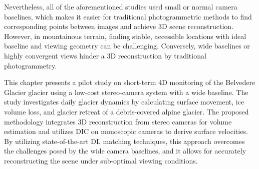 Nevertheless, all of the aforementioned studies used small or normal camera baselines, which makes it easier for traditional photogrammetric methods to find corresponding
points between images and achieve 3D scene reconstruction.
However, in mountainous terrain, finding stable, accessible locations with ideal baseline and viewing geometry can be challenging.
Conversely, wide baselines or highly convergent views hinder a 3D reconstruction by traditional photogrammetry.



This chapter presents a pilot study on short-term 4D monitoring of the Belvedere Glacier glacier using a low-cost stereo-camera system with a wide baseline. 
The study investigates daily glacier dynamics by calculating surface movement, ice volume loss, and glacier retreat of a debris-covered alpine glacier.
The proposed methodology integrates 3D reconstruction from stereo cameras for volume estimation and utilizes DIC on monoscopic cameras to derive surface velocities.
By utilizing state-of-the-art DL matching techniques, this approach overcomes the challenges posed by the wide camera baselines, and it allows for accurately
reconstructing the scene under sub-optimal viewing conditions.

